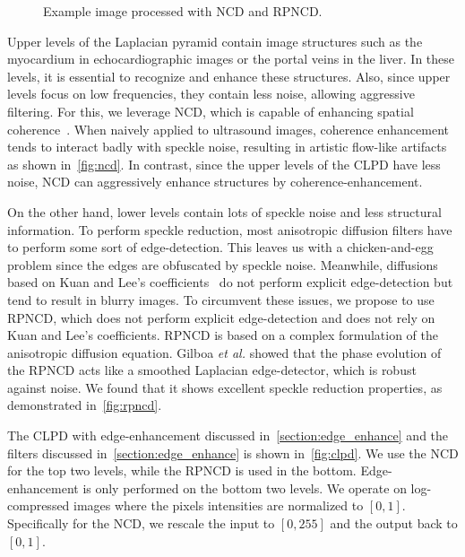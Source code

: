 \begin{figure}[t]
{  }
  \caption{Example image processed with NCD and RPNCD.}\label{fig:ncd_liver}
  \vspace{-0.1in}
\end{figure}
%

Upper levels of the Laplacian pyramid contain image structures such as the myocardium in echocardiographic images or the portal veins in the liver.
In these levels, it is essential to recognize and enhance these structures.
Also, since upper levels focus on low frequencies, they contain less noise, allowing aggressive filtering.
For this, we leverage NCD, which is capable of enhancing spatial coherence~\cite{weickert_coherenceenhancing_1999}.
When naively applied to ultrasound images, coherence enhancement tends to interact badly with speckle noise, resulting in artistic flow-like artifacts as shown in~\cref{fig:ncd}.
In contrast, since the upper levels of the CLPD have less noise, NCD can aggressively enhance structures by coherence-enhancement.

On the other hand, lower levels contain lots of speckle noise and less structural information.
To perform speckle reduction, most anisotropic diffusion filters have to perform some sort of edge-detection.
This leaves us with a chicken-and-egg problem since the edges are obfuscated by speckle noise.
Meanwhile, diffusions based on Kuan and Lee's coefficients~\cite{yongjianyu_speckle_2002, aja-fernandez_estimation_2006, krissian_oriented_2007} do not perform explicit edge-detection but tend to result in blurry images.
To circumvent these issues, we propose to use RPNCD, which does not perform explicit edge-detection and does not rely on Kuan and Lee's coefficients.
RPNCD is based on a complex formulation of the anisotropic diffusion equation.
Gilboa \textit{et al.} showed that the phase evolution of the RPNCD acts like a smoothed Laplacian edge-detector, which is robust against noise.
We found that it shows excellent speckle reduction properties, as demonstrated in~\cref{fig:rpncd}.

The CLPD with edge-enhancement discussed in~\cref{section:edge_enhance} and the filters discussed in~\cref{section:edge_enhance} is shown in~\cref{fig:clpd}.
We use the NCD for the top two levels, while the RPNCD is used in the bottom.
Edge-enhancement is only performed on the bottom two levels.
We operate on log-compressed images where the pixels intensities are normalized to \([0, 1]\).
Specifically for the NCD, we rescale the input to \([0, 255]\) and the output back to \([0, 1]\).

